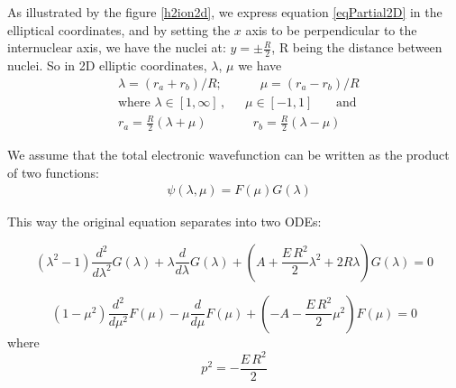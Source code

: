As illustrated by the figure \ref{h2ion2d}, we express equation \eqref{eqPartial2D} in the elliptical coordinates, and by setting the $ x $ axis to be perpendicular to the internuclear axis, we have the nuclei at: $ y = \pm \frac{R}{2}  $, R being the distance between nuclei. So in  2D elliptic coordinates, $ \lambda $, $ \mu $ we have 
\begin{equation}\label{variables1}
\begin{split}
& \lambda = \left(r_a + r_b\right)/R;\,\,\,\,\,\,\,\,\,\,\,\,\,\,\,\,\,\,\mu =  \left(r_a - r_b\right)/R  \\[1em]
& \text{where } \lambda \in \left[1,\infty\right]\,,\,\,\,\,\,\,\,\,\,\mu \in \left[ -1, 1 \right]\,\,\,\,\,\,\,\,\,\text{ and } \\[.8em] 
& r_a = \frac{R}{2}\left(\lambda + \mu \right)\,\,\,\,\,\,\,\,\,\,\,\,\,\,\,\,\,\,\,\,\,\, r_b = \frac{R}{2}\left(\lambda - \mu \right)
\end{split}
\end{equation}

We assume that the total electronic wavefunction can be written as the product of two functions:
\begin{equation}\label{variables2}
\begin{split}
& \psi(\lambda,\mu) = F(\mu)G(\lambda)
\end{split}
\end{equation}

This way the original equation separates into two ODEs:

\begin{equation}\label{L2-1}
\left(\lambda^2 - 1 \right) \frac{d^2}{ d\lambda^2 }G(\lambda) + \lambda\frac{ d}{d\lambda }G (\lambda)  + \left(A + \frac{E\,R^2}{2}\lambda^2 + 2R\lambda  \right)G (\lambda) = 0  
\end{equation}

\begin{equation}
 \left(1 - \mu^2 \right) \frac{d^2}{ d\mu^2 }F(\mu) - \mu\frac{ d }{d\mu }F(\mu) +  \left(-A -  \frac{E\,R^2}{2}\mu^2  \right)F(\mu) = 0
\end{equation}
where
\begin{equation}\label{eqP}
p^2 = -\frac{E\,R^2}{2}
\end{equation}

